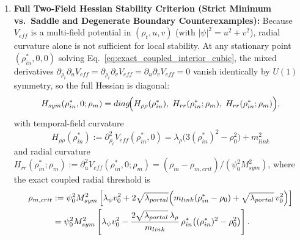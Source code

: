\documentclass[american,11pt,letterpaper]{article}
\def\mathrm#1{#1}%
\def\emph#1{#1}%
\begin{document}
\begin{enumerate}[leftmargin=2em]
  \begin{equation}
  \lambda_\rho\,\rho_{\mathrm{in}}^*\bigl((\rho_{\mathrm{in}}^*)^2 - \rho_0^2\bigr)
  + m_{\mathrm{link}}\Bigl(m_{\mathrm{link}}(\rho_{\mathrm{in}}^* - \rho_0) + \sqrt{\lambda_{\mathrm{portal}}}\,v_0^2\Bigr) = 0.
  \label{eq:exact_coupled_interior_cubic}
  \end{equation}
  \item \textbf{Full Two-Field Hessian Stability Criterion (Strict Minimum vs.\ Saddle and Degenerate Boundary Counterexamples):} Because $V_{\mathrm{eff}}$ is a multi-field potential in $(\rho_t, u, v)$ (with $|\psi|^2 = u^2 + v^2$), radial curvature alone is \emph{not} sufficient for local stability. At any stationary point $(\rho_{\mathrm{in}}^*, 0, 0)$ solving Eq.~\eqref{eq:exact_coupled_interior_cubic}, the mixed derivatives $\partial_{\rho_t}\partial_u V_{\mathrm{eff}} = \partial_{\rho_t}\partial_v V_{\mathrm{eff}} = \partial_u\partial_v V_{\mathrm{eff}} = 0$ vanish identically by $U(1)$ symmetry, so the full Hessian is diagonal:
  \begin{equation}
  H_{\mathrm{sym}}(\rho_{\mathrm{in}}^*, 0; \rho_m) = \mathrm{diag}\!\Bigl(H_{\rho\rho}(\rho_{\mathrm{in}}^*),\; H_{rr}(\rho_{\mathrm{in}}^*; \rho_m),\; H_{rr}(\rho_{\mathrm{in}}^*; \rho_m)\Bigr),
  \label{eq:exact_two_field_sym_hessian}
  \end{equation}
  with temporal-field curvature
  \begin{equation}
  H_{\rho\rho}(\rho_{\mathrm{in}}^*) := \partial_{\rho_t}^2 V_{\mathrm{eff}}(\rho_{\mathrm{in}}^*, 0) = \lambda_\rho\bigl(3(\rho_{\mathrm{in}}^*)^2 - \rho_0^2\bigr) + m_{\mathrm{link}}^2
  \label{eq:exact_H_rhorho}
  \end{equation}
  and radial curvature $H_{rr}(\rho_{\mathrm{in}}^*; \rho_m) := \partial_u^2 V_{\mathrm{eff}}(\rho_{\mathrm{in}}^*, 0; \rho_m) = (\rho_m - \rho_{m,\mathrm{crit}})/(\psi_0^2 M_{\mathrm{sym}}^2)$, where the exact coupled radial threshold is
  \begin{align}
  \rho_{m,\mathrm{crit}}
  &:= \psi_0^2 M_{\mathrm{sym}}^2\left[\lambda_\psi v_0^2 + 2\sqrt{\lambda_{\mathrm{portal}}}\Bigl(m_{\mathrm{link}}(\rho_{\mathrm{in}}^* - \rho_0) + \sqrt{\lambda_{\mathrm{portal}}}\,v_0^2\Bigr)\right] \nonumber\\
  &= \psi_0^2 M_{\mathrm{sym}}^2\left[\lambda_\psi v_0^2 - \frac{2\sqrt{\lambda_{\mathrm{portal}}}\,\lambda_\rho}{m_{\mathrm{link}}}\,\rho_{\mathrm{in}}^*\bigl((\rho_{\mathrm{in}}^*)^2 - \rho_0^2\bigr)\right].
  \label{eq:exact_coupled_screening_threshold}

\end{align}
\end{enumerate}
\end{document}
